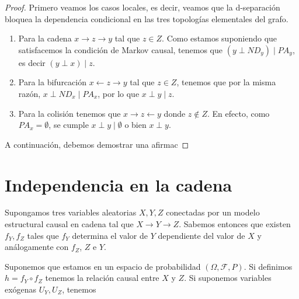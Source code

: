 \documentclass[a4paper,11pt,spanish, twoside]{tfg-uam-matematicas_25-26}
\theoremstyle{definition}
\begin{document}
\begin{proof}
Primero veamos los casos locales, es decir, veamos que la d-separación bloquea la dependencia condicional en las tres topologías elementales del grafo.
\begin{enumerate}
    \item Para la cadena $x \to z \to y$ tal que $z \in Z$. Como estamos suponiendo que satisfacemos la condición de Markov causal, tenemos que $(y \perp ND_y) \mid PA_y$, es decir $(y \perp x )\mid z$.
    \item Para la bifurcación $x \leftarrow z \to y$ tal que $z \in Z$, tenemos que por la misma razón, $x \perp ND_x \mid PA_x$, por lo que $x \perp y \mid z$.
    \item Para la colisión tenemos que $x \to z \leftarrow y$ donde $z \notin Z$. En efecto, como $PA_x = \emptyset$, se cumple $x \perp y\mid \emptyset$ o bien $x \perp y$.
\end{enumerate}

A continuación, debemos demostrar una afirmac
\end{proof}

\clearpage

\appendix 



\chapter{Independencia en la cadena}
\label{app:independent}

Supongamos tres variables aleatorias $X, Y, Z$ conectadas por un modelo estructural causal en cadena tal que $X \rightarrow Y \rightarrow Z$. Sabemos entonces que existen $f_Y, f_Z$ tales que $f_Y$ determina el valor de $Y$ dependiente del valor de $X$ y análogamente con $f_Z$, $Z$ e $Y$.

Suponemos que estamos en un espacio de probabilidad $(\Omega, \mathcal{F}, P)$. Si definimos $h = f_Y \circ f_Z$ tenemos la relación causal entre $X$ y $Z$. Si suponemos variables exógenas $U_Y, U_Z$, tenemos


\printbibliography

\cleardoublepage
\end{document}
